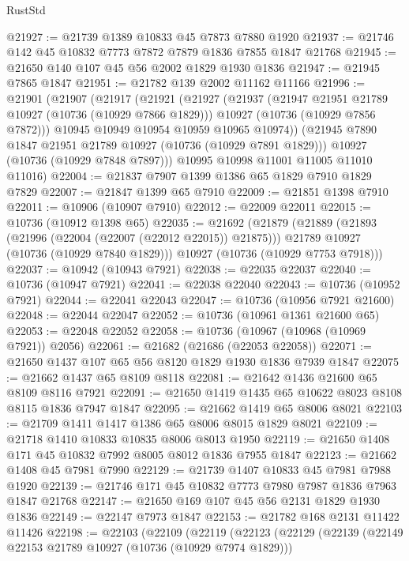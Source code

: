 \begin{lexlean}{RustStd}
\begin{coremodule}
@21927 := @21739 @1389 @10833 @45 @7873 @7880 @1920
@21937 := @21746 @142 @45 @10832 @7773 @7872 @7879 @1836 @7855 @1847 @21768
@21945 := @21650 @140 @107 @45 @56 @2002 @1829 @1930 @1836
@21947 := @21945 @7865 @1847
@21951 := @21782 @139 @2002 @11162 @11166
@21996 := @21901
    (@21907
      (@21917
        (@21921
          (@21927
            (@21937
              (@21947 @21951 @21789 @10927 (@10736 (@10929 @7866 @1829)))
              @10927
              (@10736 (@10929 @7856 @7872)))
            @10945
            @10949
            @10954
            @10959
            @10965
            @10974))
        (@21945 @7890 @1847 @21951 @21789 @10927 (@10736 (@10929 @7891 @1829)))
        @10927
        (@10736 (@10929 @7848 @7897)))
      @10995
      @10998
      @11001
      @11005
      @11010
      @11016)
@22004 := @21837 @7907 @1399 @1386 @65 @1829 @7910 @1829 @7829
@22007 := @21847 @1399 @65 @7910
@22009 := @21851 @1398 @7910
@22011 := @10906 (@10907 @7910)
@22012 := @22009 @22011
@22015 := @10736 (@10912 @1398 @65)
@22035 := @21692
    (@21879
      (@21889
        (@21893 (@21996 (@22004 (@22007 (@22012 @22015)) @21875)))
        @21789
        @10927
        (@10736 (@10929 @7840 @1829)))
      @10927
      (@10736 (@10929 @7753 @7918)))
@22037 := @10942 (@10943 @7921)
@22038 := @22035 @22037
@22040 := @10736 (@10947 @7921)
@22041 := @22038 @22040
@22043 := @10736 (@10952 @7921)
@22044 := @22041 @22043
@22047 := @10736 (@10956 @7921 @21600)
@22048 := @22044 @22047
@22052 := @10736 (@10961 @1361 @21600 @65)
@22053 := @22048 @22052
@22058 := @10736 (@10967 (@10968 (@10969 @7921)) @2056)
@22061 := @21682 (@21686 (@22053 @22058))
@22071 := @21650 @1437 @107 @65 @56 @8120 @1829 @1930 @1836 @7939 @1847
@22075 := @21662 @1437 @65 @8109 @8118
@22081 := @21642 @1436 @21600 @65 @8109 @8116 @7921
@22091 := @21650 @1419 @1435 @65 @10622 @8023 @8108 @8115 @1836 @7947 @1847
@22095 := @21662 @1419 @65 @8006 @8021
@22103 := @21709 @1411 @1417 @1386 @65 @8006 @8015 @1829 @8021
@22109 := @21718 @1410 @10833 @10835 @8006 @8013 @1950
@22119 := @21650 @1408 @171 @45 @10832 @7992 @8005 @8012 @1836 @7955 @1847
@22123 := @21662 @1408 @45 @7981 @7990
@22129 := @21739 @1407 @10833 @45 @7981 @7988 @1920
@22139 := @21746 @171 @45 @10832 @7773 @7980 @7987 @1836 @7963 @1847 @21768
@22147 := @21650 @169 @107 @45 @56 @2131 @1829 @1930 @1836
@22149 := @22147 @7973 @1847
@22153 := @21782 @168 @2131 @11422 @11426
@22198 := @22103
    (@22109
      (@22119
        (@22123
          (@22129
            (@22139
              (@22149 @22153 @21789 @10927 (@10736 (@10929 @7974 @1829)))

\end{coremodule}
\end{lexlean}
